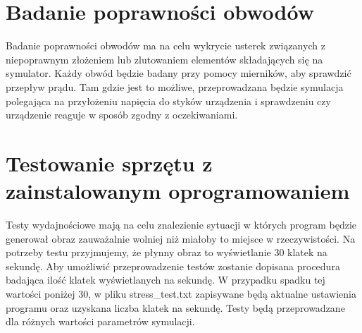 \documentclass[12pt,a4paper]{article}
\begin{document}
\section{Badanie poprawności obwodów}
Badanie poprawności obwodów ma na celu wykrycie usterek związanych z niepoprawnym złożeniem lub 
zlutowaniem elementów składających się na symulator. Każdy obwód będzie badany przy pomocy 
mierników, aby sprawdzić przepływ prądu. Tam gdzie jest to możliwe, przeprowadzana będzie symulacja 
polegająca na przyłożeniu napięcia do styków urządzenia i sprawdzeniu czy urządzenie reaguje w 
sposób zgodny z oczekiwaniami.

\section{Testowanie sprzętu z zainstalowanym oprogramowaniem}
Testy wydajnościowe mają na celu znalezienie sytuacji w których program będzie generował obraz 
zauważalnie wolniej niż miałoby to miejsce w rzeczywistości. Na potrzeby testu przyjmujemy, że 
płynny obraz to wyświetlanie 30 klatek na sekundę. Aby umożliwić przeprowadzenie testów zostanie 
dopisana procedura badająca ilość klatek wyświetlanych na sekundę. W przypadku spadku tej wartości 
poniżej 30, w pliku stress\_test.txt zapisywane będą aktualne ustawienia programu oraz uzyskana 
liczba klatek na sekundę. Testy będą przeprowadzane dla różnych wartości parametrów symulacji.
\end{document}
